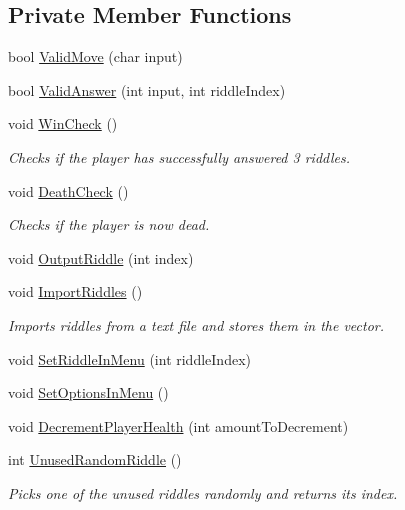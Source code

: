 \subsection*{Private Member Functions}
\begin{DoxyCompactItemize}
\item 
bool \hyperlink{classCodeCracker_a793271a6ea1d8affad8fdddbbd692f7a}{Valid\-Move} (char input)
\item 
bool \hyperlink{classCodeCracker_aeddf29fcc2034f0acb41d41e0f755a3c}{Valid\-Answer} (int input, int riddle\-Index)
\item 
void \hyperlink{classCodeCracker_a3177ddb9deb208ac462d55970b112626}{Win\-Check} ()
\begin{DoxyCompactList}\small\item\em Checks if the player has successfully answered 3 riddles. \end{DoxyCompactList}\item 
void \hyperlink{classCodeCracker_a9fd7f74660bef36842fc8293b3d5ed31}{Death\-Check} ()
\begin{DoxyCompactList}\small\item\em Checks if the player is now dead. \end{DoxyCompactList}\item 
void \hyperlink{classCodeCracker_a02a6f156f051feca5691b8a4c4f44310}{Output\-Riddle} (int index)
\item 
void \hyperlink{classCodeCracker_a13ef45a98032d321c825e7a2c5439a33}{Import\-Riddles} ()
\begin{DoxyCompactList}\small\item\em Imports riddles from a text file and stores them in the vector. \end{DoxyCompactList}\item 
void \hyperlink{classCodeCracker_a177a635a52ceb27eb1165b32cc0a3b73}{Set\-Riddle\-In\-Menu} (int riddle\-Index)
\item 
void \hyperlink{classCodeCracker_acbbd890be17cec27b879eb369de82017}{Set\-Options\-In\-Menu} ()
\item 
void \hyperlink{classCodeCracker_a076c2199e775591298674b0f20ed437e}{Decrement\-Player\-Health} (int amount\-To\-Decrement)
\item 
int \hyperlink{classCodeCracker_a55bebba723a92d780659f016e9e394e4}{Unused\-Random\-Riddle} ()
\begin{DoxyCompactList}\small\item\em Picks one of the unused riddles randomly and returns its index. \end{DoxyCompactList}\end{DoxyCompactItemize}
